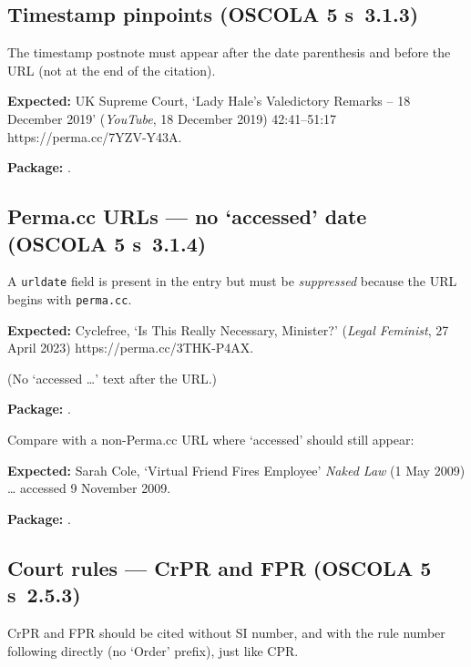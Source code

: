 \documentclass[12pt]{article}
\newcommand{\expected}[1]{\par\textbf{Expected:} #1}
\newcommand{\pkg}{\par\textbf{Package:} }
\begin{document}
\subsection{Timestamp pinpoints (OSCOLA 5 s~3.1.3)}

The timestamp postnote must appear after the date parenthesis and
before the URL (not at the end of the citation).

\expected{%
  UK Supreme Court, `Lady Hale's Valedictory Remarks -- 18 December 2019'
  (\emph{YouTube}, 18 December 2019) 42:41--51:17
  \textlangle{}https://perma.cc/7YZV-Y43A\textrangle.%
}

\pkg
\cite[42:41--51:17]{uksc:hale19}.

\subsection{Perma.cc URLs — no `accessed' date
  (OSCOLA 5 s~3.1.4)}

A \texttt{urldate} field is present in the entry but must be
\emph{suppressed} because the URL begins with \texttt{perma.cc}.

\expected{%
  Cyclefree, `Is This Really Necessary, Minister?'
  (\emph{Legal Feminist}, 27 April 2023)
  \textlangle{}https://perma.cc/3THK-P4AX\textrangle.%
}

(No `accessed \ldots' text after the URL.)

\pkg
\cite{cyclefree:2023}.

Compare with a non-Perma.cc URL where `accessed' should still appear:

\expected{%
  Sarah Cole, `Virtual Friend Fires Employee' \emph{Naked Law}
  (1 May 2009) \textlangle{}\ldots\textrangle{} accessed 9 November 2009.%
}

\pkg
\cite{cole09}.

\subsection{Court rules — CrPR and FPR (OSCOLA 5 s~2.5.3)}

CrPR and FPR should be cited without SI number, and with the rule
number following directly (no `Order' prefix), just like CPR.
\end{document}
